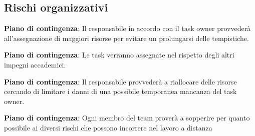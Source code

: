 	\subsection{Rischi organizzativi}

		\def\productquality{
    			{
        			Calcolo	tempistiche e costi	
							RO1,
        			Causa RT1 le valutazioni sulle tempistiche e i costi economici potrebbero essere imprecisi, 
        			Vengono predisposte delle tabelle sulle tempistiche e sarà compito del responsabile monitorare l'andamento dello sviluppo,
        			Occorrenza: Alta 
							Pericolosità: Alta
    			},
		}
		
		\textbf{Piano di contingenza}: Il responsabile in accordo con il task owner provvederà all'assegnazione di maggiori risorse per evitare un prolungarsi delle tempistiche.
		\def\productquality{
			{
        			Impegni
				Accademici
				RO2,
        			Il periodo di sviluppo del progetto inizia a ridosso della sessione d'esami universitaria a cui tutti i membri del gruppo si vedono impegnati in diverse occasioni, 
        			In sede di riunione il team ha deciso di condividere i periodi di tempo in cui il loro contributo al progetto potrebbe calare o venir meno,
        			Occorrenza: Media 
				Pericolosità: Media
    			},
		}
		
		\textbf{Piano di contingenza}: Le task verranno assegnate nel rispetto degli altri impegni accademici.
		\pagebreak
		\def\productquality{
			{
        			Impegni
				Personali
				RO3,
        			è possibile il verificarsi di imprevisti personali che potrebbero influire nel corretto sviluppo del progetto, 
        			è compito di ogni membro del gruppo segnalare un eventuale imprevisto al responsabile del gruppo in modo da permettergli di riorganizzare l'agenda,
        			Occorrenza: Bassa 
				Pericolosità: Bassa
    			},
		}
		
		\textbf{Piano di contingenza}: Il responsabile provvederà a riallocare delle risorse cercando di limitare i danni di una possibile temporanea mancanza del task owner.
		
		\def\productquality{
			{
        			Rischi legati al lavoro a distanza
				RO4,
        			La pandemia COVID ci impedisce il lavoro in presenza esponendoci ai rischi del lavoro a distanza, 
        			Malfunzionamenti hardware o instabilità della connessione a internet non sono fattori di rischio controllabili o pronosticabili,
        			Occorrenza: Bassa 
				Pericolosità: Media
    			},
		}
		
		\textbf{Piano di contingenza}: Ogni membro del team proverà a sopperire per quanto possibile ai diversi rischi che possono incorrere nel lavoro a distanza

